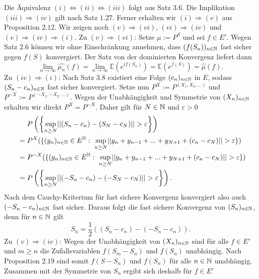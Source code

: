 \begin{proof*}
    Die Äquivalenz $(i) \iff (ii) \iff (iii)$ folgt aus Satz $3.6$. Die Implikation $(iii) \Rightarrow (iv)$ gilt nach Satz $1.27$. Ferner erhalten wir $(i) \Rightarrow (v)$ aus Proposition $2.12$.
    Wir zeigen noch $(v)\Rightarrow (vi)$, $(vi) \Rightarrow (iv)$ und $(v) \Rightarrow (iv) \Rightarrow (i)$. 
    \newline
    Zu $(v)\Rightarrow (vi)$: Setze $\mu := P^S$ und sei $f \in E'$. Wegen Satz $2.6$ können wir ohne Einschränkung annehmen, dass $(f(S_n))_{n \in \mathbb{N}}$ fast sicher gegen $f(S)$ konvergiert. 
    Der Satz von der dominierten Konvergenz liefert dann 
    $$
        \lim_{n \to \infty}\widehat{\mu_n}(f) = \lim_{n \to \infty}\mathbb{E}(e^{if(S_n)}) = \mathbb{E}(e^{f(S)}) = \widehat{\mu}(f).
    $$
    \newline
    Zu $(iv) \Rightarrow (i)$:
    Nach Satz $3.8$ existiert eine Folge $(c_n)_{n \in \mathbb{N}}$ in $E$, sodass $(S_n - c_n)_{n \in \mathbb{N}}$ fast sicher konvergiert. Setze nun $P^X := P^{(X_1,X_2,...)}$ und $P^{-X} :=P^{(-X_1,-X_2,...)}$. 
    Wegen der Unabhängigkeit und Symmetrie von $(X_n)_{n \in \mathbb{N}}$ erhalten wir direkt $P^X = P^{-X}$. Daher gilt für $N \in \mathbb{N}$ und $\varepsilon >0$
    \begin{align*}
        &\quad \ P\left(\left\{ \sup_{n \geq N}\lvert\lvert (S_n - c_n) - (S_N- c_N) \rvert\rvert > \varepsilon \right\}\right) \\\
                &= P^X(\{(y_n)_{n \in \mathbb{N}}\in E^{\mathbb{N}}: \  \sup_{n \geq N}\lvert\lvert y_n + y_{n-1} + ... + y_{N+1} + (c_n - c_N) \rvert\rvert > \varepsilon \}) \\\
                &= P^{-X}(\{(y_n)_{n \in \mathbb{N}}\in E^{\mathbb{N}}: \ \sup_{n \geq N}\lvert\lvert y_n + y_{n-1} + ... + y_{N+1} + (c_n - c_N) \rvert\rvert > \varepsilon \}) \\\
                &= P\left(\left\{ \sup_{n \geq N}\lvert\lvert (-S_n - c_n) - (-S_N - c_N) \rvert\rvert > \varepsilon \right\}\right).
    \end{align*}
    Nach dem Cauchy-Kriterium für fast sichere Konvergenz konvergiert also auch $(-S_n - c_n)_{n \in \mathbb{N}}$ fast sicher. Daraus folgt die fast sichere Konvergenz von $(S_n)_{n \in \mathbb{N}}$, denn für $n \in \mathbb{N}$ gilt
    $$
       S_n =  \frac{1}{2}((S_n - c_n) - (-S_n -c_n)). 
    $$
    Zu $(v) \Rightarrow (iv)$: Wegen der Unabhängigkeit von $(X_n)_{n \in \mathbb{N}}$ sind für alle $f \in E'$ und $m \geq n$ die Zufallsvariablen $f(S_m - S_n)$ und $f(S_n)$ unabhängig. 
    Nach Proposition $2.19$ sind somit $f(S-S_n)$ und $f(S_n)$ für alle $n \in \mathbb{N}$ unabhängig. Zusammen mit der Symmetrie von $S_n$ ergibt sich deshalb für $f \in E'$
    \begin{align*}

\end{align*}
\end{proof*}
